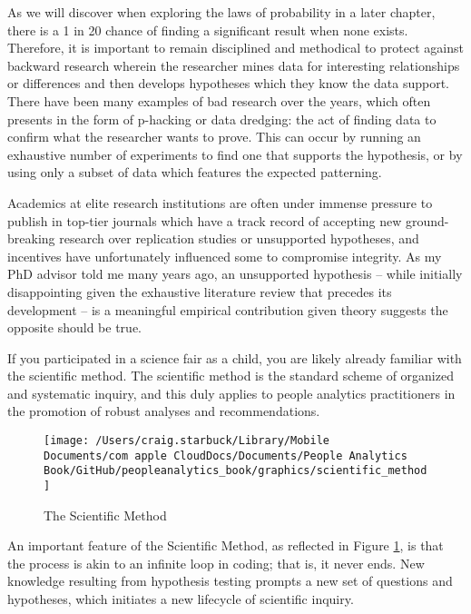 \documentclass[
]{book}
\begin{document}
As we will discover when exploring the laws of probability in a later chapter, there is a 1 in 20 chance of finding a significant result when none exists. Therefore, it is important to remain disciplined and methodical to protect against backward research wherein the researcher mines data for interesting relationships or differences and then develops hypotheses which they know the data support. There have been many examples of bad research over the years, which often presents in the form of p-hacking or data dredging: the act of finding data to confirm what the researcher wants to prove. This can occur by running an exhaustive number of experiments to find one that supports the hypothesis, or by using only a subset of data which features the expected patterning.

Academics at elite research institutions are often under immense pressure to publish in top-tier journals which have a track record of accepting new ground-breaking research over replication studies or unsupported hypotheses, and incentives have unfortunately influenced some to compromise integrity. As my PhD advisor told me many years ago, an unsupported hypothesis -- while initially disappointing given the exhaustive literature review that precedes its development -- is a meaningful empirical contribution given theory suggests the opposite should be true.

If you participated in a science fair as a child, you are likely already familiar with the scientific method. The scientific method is the standard scheme of organized and systematic inquiry, and this duly applies to people analytics practitioners in the promotion of robust analyses and recommendations.

\begin{figure}

{\centering \texttt{[image: /Users/craig.starbuck/Library/Mobile Documents/com~apple~CloudDocs/Documents/People Analytics Book/GitHub/peopleanalytics\_book/graphics/scientific\_method]} 

}

\caption{The Scientific Method}\label{fig:sci-method}
\end{figure}

An important feature of the Scientific Method, as reflected in Figure \ref{fig:sci-method}, is that the process is akin to an infinite loop in coding; that is, it never ends. New knowledge resulting from hypothesis testing prompts a new set of questions and hypotheses, which initiates a new lifecycle of scientific inquiry.
\end{document}
